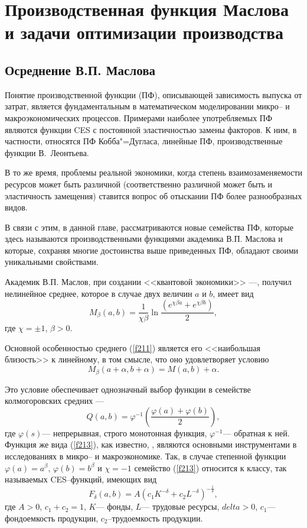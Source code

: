 \documentclass[12pt,openbib]{report}
\begin{document}
\chapter{Производственная функция Маслова и задачи оптимизации производства}

\section{Осреднение В.П. Маслова}

Понятие производственной функции (ПФ), описывающей зависимость выпуска от затрат, является фундаментальным в математическом моделировании
микро-- и макроэкономических процессов. Примерами наиболее употребляемых ПФ являются функции CES с постоянной эластичностью замены факторов.
К ним, в частности, относятся ПФ Кобба"=Дугласа, линейные ПФ, производственные функции В.~Леонтьева.

В то же время, проблемы реальной экономики, когда степень взаимозаменяемости ресурсов может быть различной
(соответственно различной может быть и эластичность замещения) ставится вопрос об отыскании ПФ более разнообразных видов.

В связи с этим, в данной главе, рассматриваются новые семейства ПФ, которые здесь называются производственными функциями академика
В.П. Маслова и которые, сохраняя многие достоинства выше приведенных ПФ, обладают своими уникальными свойствами.

Академик В.П. Маслов, при создании <<квантовой экономики>> \cite{MaslovKvant}---\cite{MaslovEconom2},
получил нелинейное среднее, которое в случае двух величин $a$ и $b$, имеет вид
\begin{equation}\label{f211}
M_\beta(a,b)=\frac1{\chi\beta}\ln\frac{(e^{\chi\beta a}+e^{\chi\beta b})}2,
\end{equation}
где $\chi=\pm1$, $\beta>0$.

Основной особенностью среднего (\ref{f211}) является его <<наибольшая близость>> к линейному, в том смысле, что оно удовлетворяет условию
\begin{equation}\label{f212}
M_\beta(a+\alpha,b+\alpha)=M(a,b)+\alpha.
\end{equation}

Это условие обеспечивает однозначный выбор функции в семействе колмогоровских средних \cite{MaslovKvant}---\cite{MaslovEconom2}
\begin{equation}\label{f213}
Q(a,b)=\varphi^{-1}\left(\frac{\varphi(a)+\varphi(b)}2\right),
\end{equation}
где $\varphi(s)$--- непрерывная, строго монотонная функция, $\varphi^{-1}$--- обратная к ней. Функция же вида (\ref{f213}), как известно,
\cite{Kolemaev}, являются основными инструментами в исследованиях в микро-- и макроэкономике.
Так, в случае степенной функции $\varphi(a)=a^\beta$, $\varphi(b)=b^\beta$ и $\chi=-1$ семейство (\ref{f213}) относится к классу,
так называемых CES--функций, имеющих вид
\begin{equation}\label{f214}
F_\delta(a,b)=A(c_1K^{-\delta}+c_2L^{-\delta})^{-\frac1\delta},
\end{equation}
где $A>0$, $c_1+c_2=1$, $K$--- фонды, $L$--- трудовые ресурсы, $delta>0$, $c_1$--- фондоемкость продукции, $c_2$--трудоемкость продукции.
\end{document}
